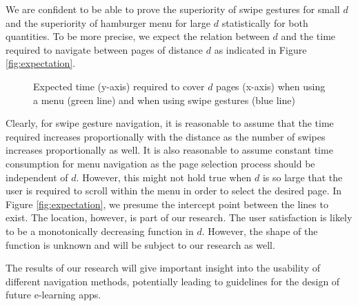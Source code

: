 \documentclass{sig-alternate-05-2015}
\begin{document}
We are confident to be able to prove the superiority of swipe gestures for small $d$ and the superiority of hamburger menu for large $d$ statistically for both quantities.
To be more precise, we expect the relation between $d$ and the time required to navigate between pages of distance $d$ as indicated in Figure \ref{fig:expectation}.
\begin{figure}
\caption{Expected time (y-axis) required to cover $d$ pages (x-axis) when using a menu (green line) and when using swipe gestures (blue line)}
\end{figure}
Clearly, for swipe gesture navigation, it is reasonable to assume that the time required increases proportionally with the distance as the number of swipes increases proportionally as well.
It is also reasonable to assume constant time consumption for menu navigation as the page selection process should be independent of $d$. However, this might not hold true when $d$ is so large that
the user is required to scroll within the menu in order to select the desired page. In Figure \ref{fig:expectation}, we presume the intercept point between the lines to exist. The location, however,
is part of our research.
The user satisfaction is likely to be a monotonically decreasing function in $d$. However, the shape of the function is unknown and will be subject to our research as well.

The results of our research will give important insight into the usability of different navigation methods, potentially leading to guidelines for the design of future e-learning apps.
\end{document}

